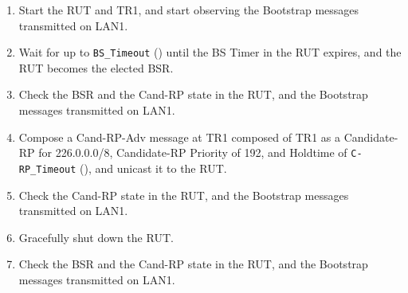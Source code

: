 \documentclass[11pt]{report}
\begin{document}

\begin{enumerate}

  \item Start the RUT and TR1, and start observing the Bootstrap messages
  transmitted on LAN1.

  \item Wait for up to \verb=BS_Timeout= ({\PimsmBSTimeout}) until the BS
  Timer in the RUT expires, and the RUT becomes the elected BSR.

  \item Check the BSR and the Cand-RP state in the RUT, and the Bootstrap
  messages transmitted on LAN1.

  \item Compose a Cand-RP-Adv message at TR1 composed of TR1 as a
   Candidate-RP for 226.0.0.0/8, Candidate-RP Priority of 192, and Holdtime of
   \verb=C-RP_Timeout= ({\PimsmCRPTimeout}), and unicast it to the RUT.

  \item Check the Cand-RP state in the RUT, and the Bootstrap
  messages transmitted on LAN1.

  \item Gracefully shut down the RUT.

  \item Check the BSR and the Cand-RP state in the RUT, and the Bootstrap
  messages transmitted on LAN1.

\end{enumerate}


\end{document}
